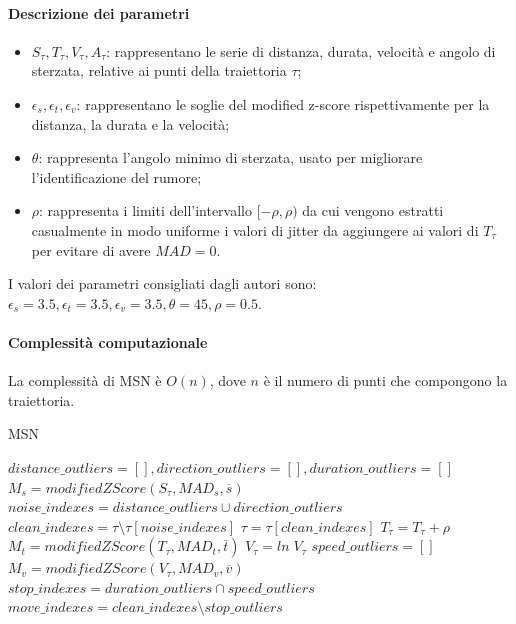 \documentclass[12pt]{article}
\begin{document}
\paragraph{Descrizione dei parametri}
\begin{itemize}
    \item $S_\tau, T_\tau, V_\tau, A_\tau$: rappresentano le serie di distanza, durata, velocità e angolo di sterzata, relative ai punti della traiettoria $\tau$;
    \item $\epsilon_s, \epsilon_t, \epsilon_v$: rappresentano le soglie del modified z-score rispettivamente per la distanza, la durata e la velocità;
    \item $\theta$: rappresenta l'angolo minimo di sterzata, usato per migliorare l'identificazione del rumore;
    \item $\rho$: rappresenta i limiti dell'intervallo $[-\rho, \rho)$ da cui vengono estratti casualmente in modo uniforme i valori di jitter da aggiungere ai valori di $T_\tau$ per evitare di avere $MAD=0$.
\end{itemize}
I valori dei parametri consigliati dagli autori sono: $\epsilon_s = 3.5, \epsilon_t = 3.5, \epsilon_v = 3.5, \theta = 45, \rho=0.5$.

\paragraph{Complessità computazionale} La complessità di MSN è $O(n)$, dove $n$ è il numero di punti che compongono la traiettoria.

\begin{algorithm}
    \caption{MSN}\label{MSN}
    $distance\_outliers = [], direction\_outliers = [], duration\_outliers = []$\;
    $M_s = modifiedZScore(S_\tau, MAD_s, \overline{s})$\;
    $noise\_indexes = distance\_outliers \cup direction\_outliers$\;
    $clean\_indexes = \tau \setminus \tau[noise\_indexes]$\;
    $\tau = \tau[clean\_indexes]$\;
    $T_\tau = T_\tau + \rho$\;
    $M_t = modifiedZScore(T_\tau, MAD_t, \overline{t})$\;
    $V_\tau = ln\;V_\tau$\;
    $speed\_outliers = []$\;
    $M_v = modifiedZScore(V_\tau, MAD_v, \overline{v})$\;
    $stop\_indexes = duration\_outliers \cap speed\_outliers$\;
    $move\_indexes = clean\_indexes \setminus stop\_outliers$\;
\end{algorithm}
\end{document}
